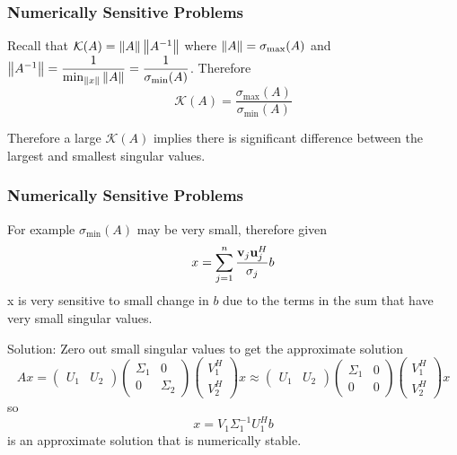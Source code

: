 \documentclass{beamer}
\begin{document}
\begin{frame}\frametitle{Numerically Sensitive Problems}
	Recall that 
	$\mathcal{K}(A) = \left\|A\right\|\left\|A^{-1}\right\|$ 
	where 
	$\left\|A\right\| = \sigma_{\max}(A)$ 
	and 
	$\left\|A^{-1} \right\| = \displaystyle\frac{1}{\min_{\left\|x\right\|}\left\|A\right\|} = \frac{1}{\sigma_{\min}(A)}$. 
		Therefore
	\[
		\mathcal{K}(A) = \frac{\sigma_{\max}(A)}{\sigma_{\min}(A)}
	\]
	
	\vfill
	
	Therefore a large $\mathcal{K}(A)$ implies there is significant difference between the largest and smallest singular values.	
\end{frame}

\begin{frame}\frametitle{Numerically Sensitive Problems}
	For example $\sigma_{\min}(A)$ may be very small, therefore given 
	\[ 
		x = \sum_{j=1}^n \frac{\mathbf{v}_j\mathbf{u}_j^H}{\sigma_j}b 
	\]
	x is very sensitive to small change in $b$ due to the terms in the sum that have very small singular values.	
	
	\vfill
	
	{\color{blue}Solution:}  
	Zero out small singular values to get the approximate solution
	\[ 
		Ax = \begin{pmatrix}
	  			U_1 & U_2  
			 \end{pmatrix}
			 \begin{pmatrix}
	    		\Sigma_1 & 0\\
	    		0 & \Sigma_2
	  		 \end{pmatrix}
	  		 \begin{pmatrix}
	    		V_1^H\\
	    		V_2^H
	  		 \end{pmatrix} x 
	  	\approx \begin{pmatrix}
	    			U_1 & U_2
	  			\end{pmatrix}
	  			\begin{pmatrix}
	    			\Sigma_1 & 0\\
	    			0 & 0
	  			\end{pmatrix}
	  			\begin{pmatrix}
	    			V_1^H\\
	    			V_2^H
	  			\end{pmatrix} x
	\]
	so
	\[ 
		x = V_1\Sigma_1^{-1}U_1^Hb 
	\]
	is an approximate solution that is numerically stable.
\end{frame}
\end{document}

